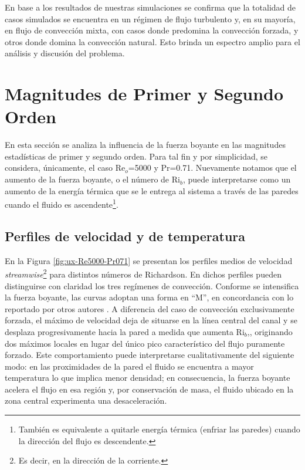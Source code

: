 En base a los resultados de nuestras simulaciones se confirma que la totalidad de casos simulados se encuentra en un régimen de flujo turbulento y, en su mayoría,  en flujo de convección mixta, con casos donde predomina la convección forzada, y otros donde domina la convección natural. Esto brinda un espectro amplio para el análisis y discusión del problema. 

\section{Magnitudes de Primer y Segundo Orden}

En esta sección se analiza la influencia de la fuerza boyante en las magnitudes estadísticas de primer y segundo orden. Para tal fin y por simplicidad, se considera, únicamente, el caso Re$_o$=5000 y Pr=0.71. Nuevamente notamos que el aumento de la fuerza boyante, o el número de Ri$_b$, puede interpretarse como un aumento de la energía térmica que se le entrega al sistema a través de las paredes cuando el fluido es ascendente\footnote{También es equivalente a quitarle energía térmica (enfriar las paredes) cuando la dirección del flujo es descendente.}.

\subsection{Perfiles de velocidad y de temperatura} \label{sec:velo_temp}

En la Figura \ref{fig:ux-Re5000-Pr071} se presentan los perfiles medios de velocidad  \textit{streamwise}\footnote{Es decir, en la dirección de la corriente.} para distintos números de Richardson. En dichos perfiles pueden distinguirse con claridad los tres regímenes de convección. Conforme se intensifica la fuerza boyante, las curvas adoptan una forma en ``M'', en concordancia con lo reportado por otros autores \cite{you2003direct, zhou2024direct}. A diferencia del caso de convección exclusivamente forzada, el máximo de velocidad deja de situarse en la línea central del canal y se desplaza progresivamente hacia la pared a medida que aumenta Ri$_b$,\cite{carr1973velocity, steiner1971reverse, zhou2024direct}, originando dos máximos locales en lugar del único pico característico del flujo puramente forzado. Este comportamiento puede interpretarse cualitativamente del siguiente modo: en las proximidades de la pared el fluido se encuentra a mayor temperatura lo que implica menor densidad; en consecuencia, la fuerza boyante acelera el flujo en esa región y, por conservación de masa, el fluido ubicado en la zona central experimenta una desaceleración.

